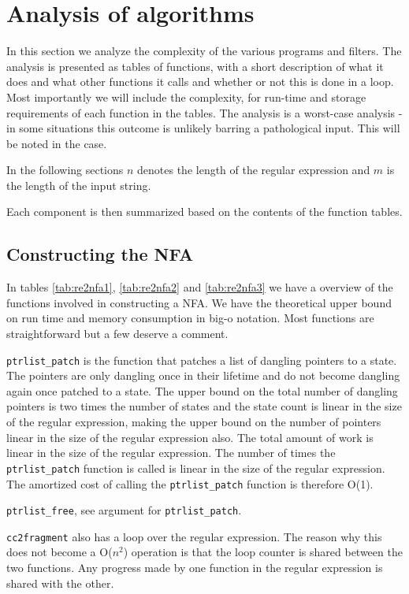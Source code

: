 \section{Analysis of algorithms}
\label{sec:theoretical}
In this section we analyze the complexity of the various programs and
filters. The analysis is presented as
tables of functions, with a short description of what it does and what
other functions it calls and whether or not this is done in a
loop. Most importantly we will include the complexity, for run-time and storage requirements of each function
in the tables. The analysis is a worst-case analysis - in some situations this outcome is unlikely barring a pathological input. This will be noted in the case.

In the following sections $n$ denotes the length of the regular
expression and $m$ is the length of the input string.

Each component is then summarized based on the contents of the function tables.

\subsection{Constructing the NFA}

In tables \ref{tab:re2nfa1}, \ref{tab:re2nfa2} and \ref{tab:re2nfa3}
we have a overview of the functions involved in constructing a NFA. We
have the theoretical upper bound on run time and memory consumption in
big-o notation. Most functions are straightforward but a few deserve a
comment. 

\lstinline{ptrlist_patch} is the function that patches a list of
dangling pointers to a state. The pointers are only dangling once in
their lifetime and do not become dangling again once 
patched to a state. The upper bound on the total number of dangling
pointers is two times the number of states and the state count is
linear in the size of the regular expression, making the upper bound
on the number of pointers linear in the size of the regular expression
also. The total amount of work is linear in the size of the regular
expression. The number of times the \lstinline{ptrlist_patch} function
is called is linear in the size of the regular expression. The
amortized cost of calling the \lstinline{ptrlist_patch} function is
therefore O(1).

\lstinline{ptrlist_free}, see argument for \lstinline{ptrlist_patch}.

\lstinline{cc2fragment} also has a loop over the regular
expression. The reason why this does not become a O($n^2$) operation is
that the loop counter is shared between the two functions. Any
progress made by one function in the regular expression is shared with
the other.

